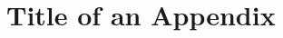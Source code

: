 \documentclass[11pt, oneside]{report} %
\providecommand\phantomsection{}
\begin{document}


\appendix

\cleardoublepage
\chapter{Title of an Appendix} \label{app:an_appendix}



\phantomsection
{}
\printbibliography[]
\end{document}
